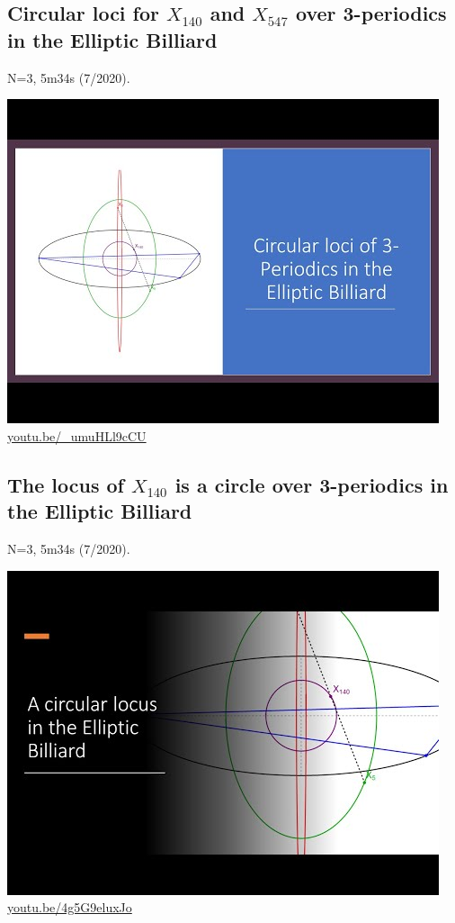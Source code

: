 \documentclass[12pt]{amsart}
\begin{document}
\subsection{Circular loci for $X_{140}$ and $X_{547}$ over 3-periodics in the Elliptic Billiard}
\label{vid:_umuHLl9cCU}
\noindent N=3, 5m34s (7/2020). 
\begin{center}\includegraphics[width=.5\textwidth]{pics/_umuHLl9cCU.jpg} \\ 
\href{https://youtu.be/_umuHLl9cCU}{\url{youtu.be/\_umuHLl9cCU}}\end{center}
% 

\subsection{The locus of $X_{140}$ is a circle over 3-periodics in the Elliptic Billiard}
\label{vid:4g5G9eluxJo}
\noindent N=3, 5m34s (7/2020). 
\begin{center}\includegraphics[width=.5\textwidth]{pics/4g5G9eluxJo.jpg} \\ 
\href{https://youtu.be/4g5G9eluxJo}{\url{youtu.be/4g5G9eluxJo}}\end{center}
% 
\end{document}

